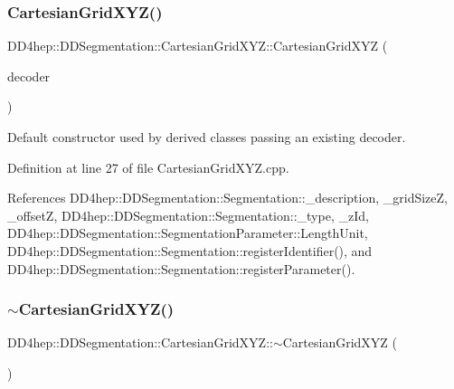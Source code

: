 \subsubsection{\texorpdfstring{Cartesian\+Grid\+X\+Y\+Z()}{CartesianGridXYZ()}\hspace{0.1cm}{\footnotesize\ttfamily [2/2]}}
{\footnotesize\ttfamily D\+D4hep\+::\+D\+D\+Segmentation\+::\+Cartesian\+Grid\+X\+Y\+Z\+::\+Cartesian\+Grid\+X\+YZ (\begin{DoxyParamCaption}\item[{\hyperlink{class_d_d4hep_1_1_d_d_segmentation_1_1_bit_field64}{Bit\+Field64} $\ast$}]{decoder }\end{DoxyParamCaption})}



Default constructor used by derived classes passing an existing decoder. 



Definition at line 27 of file Cartesian\+Grid\+X\+Y\+Z.\+cpp.



References D\+D4hep\+::\+D\+D\+Segmentation\+::\+Segmentation\+::\+\_\+description, \+\_\+grid\+SizeZ, \+\_\+offsetZ, D\+D4hep\+::\+D\+D\+Segmentation\+::\+Segmentation\+::\+\_\+type, \+\_\+z\+Id, D\+D4hep\+::\+D\+D\+Segmentation\+::\+Segmentation\+Parameter\+::\+Length\+Unit, D\+D4hep\+::\+D\+D\+Segmentation\+::\+Segmentation\+::register\+Identifier(), and D\+D4hep\+::\+D\+D\+Segmentation\+::\+Segmentation\+::register\+Parameter().

\hypertarget{class_d_d4hep_1_1_d_d_segmentation_1_1_cartesian_grid_x_y_z_aff2cbae986ce2cec75de80968a1015a3}{}\label{class_d_d4hep_1_1_d_d_segmentation_1_1_cartesian_grid_x_y_z_aff2cbae986ce2cec75de80968a1015a3} 
\subsubsection{\texorpdfstring{$\sim$\+Cartesian\+Grid\+X\+Y\+Z()}{~CartesianGridXYZ()}}
{\footnotesize\ttfamily D\+D4hep\+::\+D\+D\+Segmentation\+::\+Cartesian\+Grid\+X\+Y\+Z\+::$\sim$\+Cartesian\+Grid\+X\+YZ (\begin{DoxyParamCaption}{ }\end{DoxyParamCaption})\hspace{0.3cm}{\ttfamily [virtual]}}



